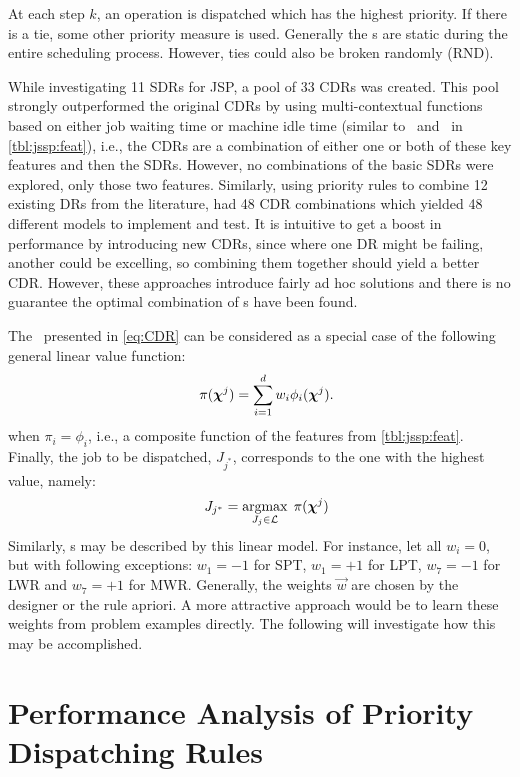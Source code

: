 \documentclass[twocolumn]{svjour3}
\begin{document}
At each step $k$, an operation is dispatched which has the highest 
priority. If there is a tie, some other priority measure is used. Generally 
the \dr s are static during the entire scheduling process. However, ties could 
also be broken randomly (RND). 

While investigating 11 SDRs for JSP, \cite{Lu13} a pool of 33 CDRs was created. 
This pool strongly outperformed the original CDRs by using multi-contextual 
functions based on either job waiting time or machine idle time (similar 
to \phiwait\ and \phimacSlack\ in \cref{tbl:jssp:feat}), i.e., the CDRs are a 
combination of either one or both of these key features and then the SDRs.
However, no combinations of the basic SDRs were explored, only those two 
features. 
Similarly, using priority rules to combine 12 existing DRs from the literature, 
\cite{Yu13} had 48 CDR combinations which yielded 48 different models 
to implement and test. 
It is intuitive to get a boost in performance by introducing new CDRs, since 
where one DR might be failing, another could be excelling, so combining them 
together should yield a better CDR. However, these approaches introduce fairly 
ad hoc solutions and there is no guarantee the optimal combination of 
\dr s have been found.

The \cdr\ presented in \cref{eq:CDR} can be considered as a special case of 
the following general linear value function:
\begin{equation}\quad\label{eq:jssp:linweights}
\pi(\bm \chi^j)=\sum_{i=1}^d w_i \phi_i(\bm \chi^j).
\end{equation}
when $\pi_i=\phi_i$, i.e., a composite function of the features 
from \cref{tbl:jssp:feat}. Finally, the job to be dispatched, $J_{j^*}$, 
corresponds to the one with the highest value, namely:
\begin{equation}\quad\label{eq:jstar}
J_{j^*}=\mathop{\rm argmax}_{J_j\in \mathcal{L}}\; \pi(\bm \chi^j)
\end{equation}
Similarly, \sdr s may be described by this linear model. For instance, let all 
$w_i=0$, but with following exceptions: $w_1=-1$ for SPT, $w_1=+1$ for LPT, 
$w_7=-1$ for LWR and $w_7=+1$ for MWR. Generally, the weights $\vec{w}$ are 
chosen by the designer or the 
rule apriori. A more attractive approach would be to learn these weights from 
problem examples directly. The following  will  
investigate how this may be accomplished.

\section{Performance Analysis of Priority Dispatching Rules}\label{sec:learnOPT}
\end{document}
